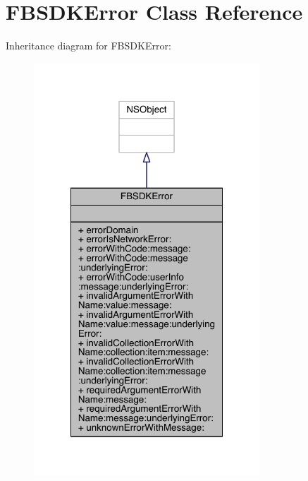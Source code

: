 \hypertarget{interface_f_b_s_d_k_error}{\section{F\-B\-S\-D\-K\-Error Class Reference}
\label{interface_f_b_s_d_k_error}
}


Inheritance diagram for F\-B\-S\-D\-K\-Error\-:
\nopagebreak
\begin{figure}[H]
\begin{center}
\leavevmode
\includegraphics[width=240pt]{interface_f_b_s_d_k_error__inherit__graph}
\end{center}
\end{figure}



